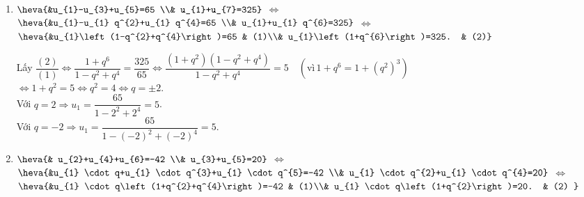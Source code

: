 \begin{vd}
{\begin{enumerate}
			$\dfrac{5}{q^{2}}\left(q+q^{2}+q^{3}\right)=\dfrac{35}{2} \Leftrightarrow 2\left(1+q+q^{2}\right)=7q \Leftrightarrow 2 q^{2}-5 q+2=0 \Leftrightarrow \hoac{&q=2 \\& q=\dfrac{1}{2}.}$\\
			Với $q=2 \Rightarrow u_{1}=\dfrac{5}{4}$.\\
			Với $q=\dfrac{1}{2} \Rightarrow u_{1}=20$.
			\item $ \heva{&u_{1}-u_{3}+u_{5}=65 \\& u_{1}+u_{7}=325} $ $ \Leftrightarrow $ 
			$ \heva{&u_{1}-u_{1} q^{2}+u_{1} q^{4}=65 \\& u_{1}+u_{1} q^{6}=325} $ $\Leftrightarrow  $
			$ \heva{&u_{1}\left(1-q^{2}+q^{4}\right)=65 & (1)\\& u_{1}\left(1+q^{6}\right)=325. & (2)}$
			
			Lấy $\dfrac{(2)}{(1)} \Leftrightarrow \dfrac{1+q^{6}}{1-q^{2}+q^{4}}=\dfrac{325}{65} \Leftrightarrow \dfrac{\left(1+q^{2}\right)\left(1-q^{2}+q^{4}\right)}{1-q^{2}+q^{4}}=5 \quad \left( \text{vì} \, 1+q^{6}=1+\left(q^{2}\right)^{3}\right)$\\
			$\Leftrightarrow 1+q^{2}=5 \Leftrightarrow q^{2}=4 \Leftrightarrow q= \pm 2$.\\
			Với $q=2 \Rightarrow u_{1}=\dfrac{65}{1-2^{2}+2^{4}}=5$.\\
			Với $q=-2 \Rightarrow u_{1}=\dfrac{65}{1-(-2)^{2}+(-2)^{4}}=5$. 
			\item $ \heva{& u_{2}+u_{4}+u_{6}=-42 \\& u_{3}+u_{5}=20}$ $ \Leftrightarrow $
			$ \heva{&u_{1} \cdot q+u_{1} \cdot q^{3}+u_{1} \cdot q^{5}=-42 \\& u_{1} \cdot q^{2}+u_{1} \cdot q^{4}=20} $ $ \Leftrightarrow $
			$ \heva{&u_{1} \cdot q\left(1+q^{2}+q^{4}\right)=-42 & (1)\\& u_{1} \cdot q\left(1+q^{2}\right)=20. & (2) }$
			

\end{enumerate}}
\end{vd}
